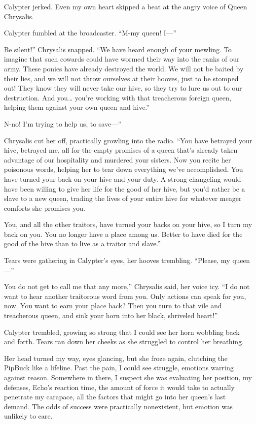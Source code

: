Calypter jerked. Even my own heart skipped a beat at the angry voice of Queen Chrysalis.

Calypter fumbled at the broadcaster. “M-my queen! I—”

\leavevmode{}Be silent!” Chrysalis snapped. “We have heard enough of your mewling. To imagine that such cowards could have wormed their way into the ranks of our army. These ponies have already destroyed the world. We will not be baited by their lies, and we will not throw ourselves at their hooves, just to be stomped out! They know they will never take our hive, so they try to lure us out to our destruction. And you… you’re working with that treacherous foreign queen, helping them against your own queen and hive.”

\leavevmode{}N-no! I’m trying to help us, to save—”

Chrysalis cut her off, practically growling into the radio. “You have betrayed your hive, betrayed me, all for the empty promises of a queen that’s already taken advantage of our hospitality and murdered your sisters. Now you recite her poisonous words, helping her to tear down everything we’ve accomplished. You have turned your back on your hive and your duty. A strong changeling would have been willing to give her life for the good of her hive, but you’d rather be a slave to a new queen, trading the lives of your entire hive for whatever meager comforts she promises you.

\leavevmode{}You, and all the other traitors, have turned your backs on your hive, so I turn my back on you. You no longer have a place among us. Better to have died for the good of the hive than to live as a traitor and slave.”

Tears were gathering in Calypter’s eyes, her hooves trembling. “Please, my queen—”

\leavevmode{}You do not get to call me that any more,” Chrysalis said, her voice icy. “I do not want to hear another traitorous word from you. Only actions can speak for you, now. You want to earn your place back? Then you turn to that vile and treacherous queen, and sink your horn into her black, shriveled heart!”

Calypter trembled, growing so strong that I could see her horn wobbling back and forth. Tears ran down her cheeks as she struggled to control her breathing.

Her head turned my way, eyes glancing, but she froze again, clutching the PipBuck like a lifeline. Past the pain, I could see struggle, emotions warring against reason. Somewhere in there, I suspect she was evaluating her position, my defenses, Echo’s reaction time, the amount of force it would take to actually penetrate my carapace, all the factors that might go into her queen’s last demand. The odds of success were practically nonexistent, but emotion was unlikely to care.

